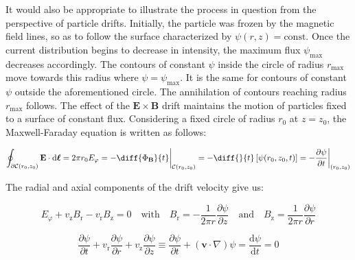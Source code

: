 \quad It would also be appropriate to illustrate the process in question from the perspective of particle drifts. Initially, the particle was frozen by the magnetic field lines, so as to follow the surface characterized by $\psi(r,z)=\text{const.}$ Once the current distribution begins to decrease in intensity, the maximum flux $\psi_\text{max}$ decreases accordingly. The contours of constant $\psi$ inside the circle of radius $r_\text{max}$ move towards this radius where $\psi=\psi_\text{max}$. It is the same for contours of constant $\psi$ outside the aforementioned circle. The annihilation of contours reaching radius $r_\text{max}$ follows. The effect of the $\mathbf{E}\times\mathbf{B}$ drift maintains the motion of particles fixed to a surface of constant flux. Considering a fixed circle of radius $r_0$ at $z=z_0$, the Maxwell-Faraday equation is written as follows:

\begin{equation}
    \oint_{\partial\mathcal{C}(r_0,z_0)}\mathbf{E}\cdot\mathrm{d}\boldsymbol{\ell}=2\pi r_0E_\varphi=-\diff{\Phi_\mathbf{B}}{t}\biggr|_{\mathcal{C}(r_0,z_0)}=-\diff{}{t}\left[\psi(r_0,z_0,t)\right]=-\frac{\partial\psi}{\partial t}\biggr|_{(r_0,z_0)}
\end{equation}

The radial and axial components of the drift velocity give us:

\begin{equation}
    E_\varphi+v_\text{z}B_\text{r}-v_\text{r}B_\text{z}=0\quad\text{with}\quad B_\text{r}=-\frac{1}{2\pi r}\frac{\partial\psi}{\partial z}\quad\text{and}\quad B_\text{z}=\frac{1}{2\pi r}\frac{\partial\psi}{\partial r}
\end{equation}

\begin{equation}
    \frac{\partial\psi}{\partial t}+v_\text{r}\frac{\partial\psi}{\partial r}+v_\text{z}\frac{\partial\psi}{\partial z}\equiv\frac{\partial\psi}{\partial t}+(\mathbf{v}\cdot\nabla)\psi=\frac{\mathrm{d}\psi}{\mathrm{d}t}=0
\end{equation}

